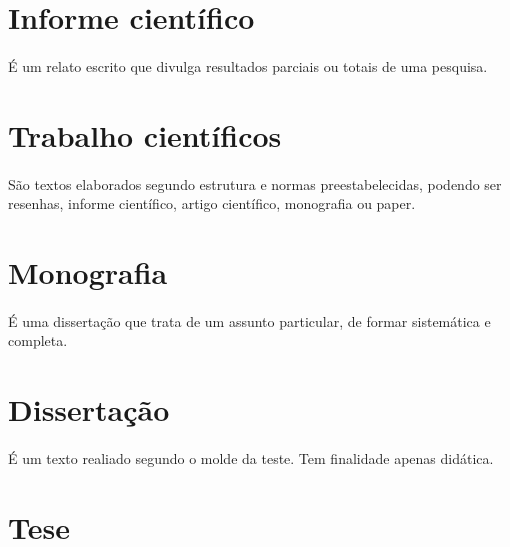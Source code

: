 \section{Informe científico}

\paragraph{}
É um relato escrito que divulga resultados parciais ou totais de uma pesquisa.

\section{Trabalho científicos}

\paragraph{}
São textos elaborados segundo estrutura e normas preestabelecidas, podendo ser resenhas, informe científico, artigo científico, monografia ou paper.

\section{Monografia}

\paragraph{}

É uma dissertação que trata de um assunto particular, de formar sistemática e completa.

\section{Dissertação}

\paragraph{}
É um texto realiado segundo o molde da teste. Tem finalidade apenas didática.

\section{Tese}

\paragraph{}

